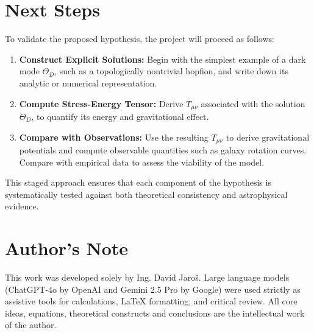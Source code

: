 \documentclass[12pt]{article}
\begin{document}
\section*{Next Steps}
To validate the proposed hypothesis, the project will proceed as follows:

\begin{enumerate}
  \item \textbf{Construct Explicit Solutions:} Begin with the simplest example of a dark mode \( \Theta_D \), such as a topologically nontrivial hopfion, and write down its analytic or numerical representation.
  \item \textbf{Compute Stress-Energy Tensor:} Derive \( T_{\mu\nu} \) associated with the solution \( \Theta_D \), to quantify its energy and gravitational effect.
  \item \textbf{Compare with Observations:} Use the resulting \( T_{\mu\nu} \) to derive gravitational potentials and compute observable quantities such as galaxy rotation curves. Compare with empirical data to assess the viability of the model.
\end{enumerate}

This staged approach ensures that each component of the hypothesis is systematically tested against both theoretical consistency and astrophysical evidence.


\section*{Author's Note}

This work was developed solely by Ing. David Jaroš.  
Large language models (ChatGPT-4o by OpenAI and Gemini 2.5 Pro by Google) were used strictly as assistive tools for calculations, LaTeX formatting, and critical review.  
All core ideas, equations, theoretical constructs and conclusions are the intellectual work of the author.
\end{document}
